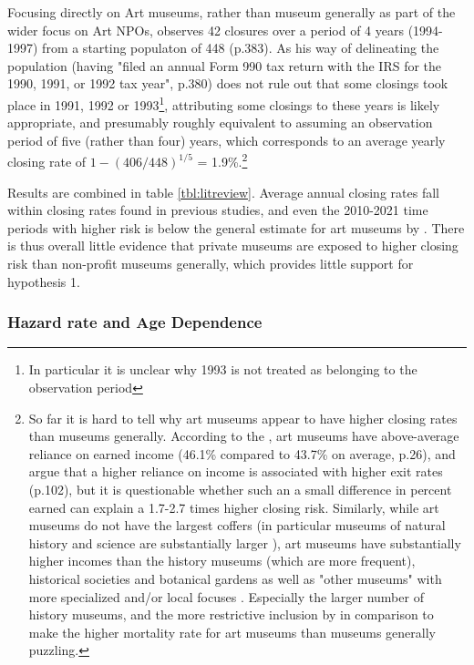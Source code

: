 \documentclass[12pt]{article}
\begin{document}
Focusing directly on Art museums, rather than museum generally as part of the wider focus on Art NPOs, \textcite{Hager_2001_vulnerability} observes 42 closures over a period of 4 years (1994-1997) from a starting populaton of 448 (p.383).
As his way of delineating the population (having "filed an annual Form 990 tax return with the IRS for the 1990, 1991, or 1992 tax year", p.380) does not rule out that some closings took place in 1991, 1992 or 1993\footnote{In particular it is unclear why 1993 is not treated as belonging to the observation period}, attributing some closings to these years is likely appropriate, and presumably roughly equivalent to assuming an observation period of five (rather than four) years, which corresponds to an average yearly closing rate of \(1-(406/448)^{1/5}\) = 1.9\%.\footnote{So far it is hard to tell why art museums appear to have higher closing rates than museums generally.
According to the \textcite{IMLS_2008_funding}, art museums have above-average reliance on earned income (46.1\% compared to 43.7\% on average, p.26), and \textcite{Bowen_etal_1994_charitable} argue that a higher reliance on income is associated with higher exit rates (p.102), but it is questionable whether such an a small difference in percent earned can explain a 1.7-2.7 times higher closing risk.
Similarly, while art museums do not have the largest coffers (in particular museums of natural history and science are substantially larger \parencite{IMLS_2008_funding,Bowen_etal_1994_charitable}), art museums have substantially higher incomes than the history museums (which are more frequent), historical societies and botanical gardens \parencite{IMLS_2008_funding} as well as "other museums" with more specialized and/or local focuses \parencite{Bowen_etal_1994_charitable}.
Especially the larger number of history museums, and the more restrictive inclusion by \textcite{Hager_2001_vulnerability} in comparison to \textcite{Bowen_etal_1994_charitable} make the higher mortality rate for art museums than museums generally puzzling.} 




Results are combined in table \ref{tbl:litreview}.
Average annual closing rates fall within closing rates found in previous studies, and even the 2010-2021 time periods with higher risk is below the general estimate for art museums by \textcite{Hager_2001_vulnerability}.
There is thus overall little evidence that private museums are exposed to higher closing risk than non-profit museums generally, which provides little support for hypothesis 1.
\subsubsection*{Hazard rate and Age Dependence}
\end{document}
